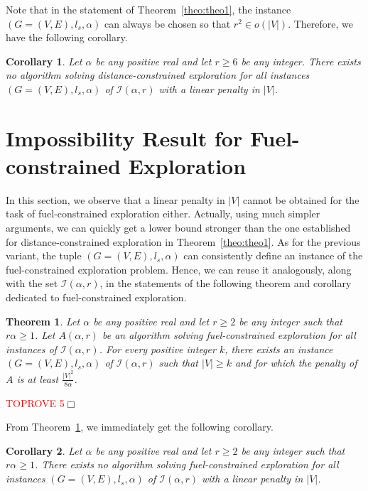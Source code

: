 \documentclass[11pt]{article}
\newtheorem{theorem}{Theorem}[section]
\newtheorem{corollary}{Corollary}[section]
\newcommand{\qed}{\hfill $\Box$ \bigbreak}
\newenvironment{proof}{\noindent {\bf Proof.}}{\qed}
\begin{document}
{Note that in the statement of Theorem~\ref{theo:theo1}, the instance $(G=(V, E), l_s, \alpha)$ can always be chosen so that $r^2\in o(|V|)$. Therefore, we have the following corollary.

\begin{corollary}
\label{col:col1}
Let $\alpha$ be any positive real and let $r\geq 6$ be any integer. There exists no algorithm solving distance-constrained exploration for all instances $(G=(V,E),l_s,\alpha)$ of $\mathcal{I}(\alpha,r)$ with a linear penalty in $|V|$.
\end{corollary}

\section{Impossibility Result for Fuel-constrained Exploration}

In this section, we observe that a linear penalty in $|V|$ cannot be obtained for the task of fuel-constrained exploration either. Actually, using much simpler arguments, we can quickly get a lower bound stronger than the one established for distance-constrained exploration in Theorem~\ref{theo:theo1}. As for the previous variant, the tuple $(G=(V,E),l_s,\alpha)$ can consistently define an instance of the fuel-constrained exploration problem. Hence, we can reuse it analogously, along with the set $\mathcal{I}(\alpha,r)$, in the statements of the following theorem and corollary dedicated to fuel-constrained exploration.

\begin{theorem}
\label{theo:theo2}
Let $\alpha$ be any positive real and let $r\geq 2$ be any integer such that $r\alpha\geq 1$. Let $A(\alpha,r)$ be an algorithm solving fuel-constrained exploration for all instances of $\mathcal{I}(\alpha,r)$. For every positive integer $k$, there exists an instance $(G=(V,E),l_s,\alpha)$ of $\mathcal{I}(\alpha,r)$ such that $|V|\geq k$ and for which the penalty of $A$ is at least $\frac{|V|^2}{8\alpha}$.
\end{theorem}

\begin{proof}\textcolor{red}{TOPROVE 5}\end{proof}

From Theorem~\ref{theo:theo2}, we immediately get the following corollary.

\begin{corollary}
\label{col:col2}
Let $\alpha$ be any positive real and let $r\geq 2$ be any integer such that $r\alpha\geq 1$. There exists no algorithm solving fuel-constrained exploration for all instances $(G=(V,E),l_s,\alpha)$ of $\mathcal{I}(\alpha,r)$ with a linear penalty in $|V|$.
\end{corollary}

}
\end{document}
